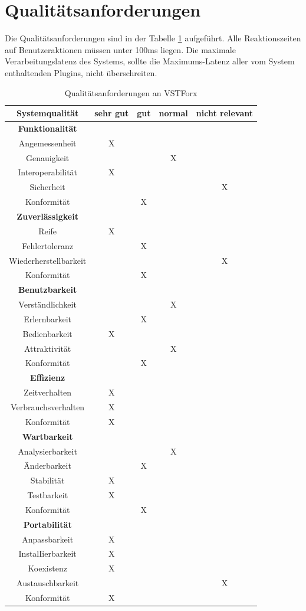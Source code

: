 \section{Qualitätsanforderungen}


\newcommand{\haupt}[1]{\textbf{#1}		&				& 			&			& 	 			    \\}
\newcommand{\noteA}[1]{\hline#1			&		X		& 			&			& 	 			    \\}
\newcommand{\noteB}[1]{\hline#1			&		 		& 	   X		&			& 	 			    \\}
\newcommand{\noteC}[1]{\hline#1			&				& 			&	   X		& 	 			    \\}
\newcommand{\noteD}[1]{\hline#1			&				& 			&			& 	 	X		    \\}
\newcommand{\noteX}[1]{\hline#1			&		-		& 	    -		&	    -     	& 	 	-		    \\}

Die Qualitätsanforderungen sind in der Tabelle \ref{quali} aufgeführt.
 Alle Reaktionszeiten auf Benutzeraktionen müssen unter 100ms liegen. Die maximale Verarbeitungslatenz des Systems, sollte die Maximums-Latenz aller vom System enthaltenden Plugins, nicht überschreiten.

\begin{table}[htdp]
\caption{Qualitätsanforderungen an VSTForx}
\begin{center}
\begin{tabular}{c|c|c|c|c}

Systemqualität				&	sehr gut	& 	gut		&	normal	& 	nicht relevant \\
\hline 
\hline 
\haupt{Funktionalität}	
\noteA{Angemessenheit} 	
\noteC{Genauigkeit}				
\noteA{Interoperabilität}
\noteD{Sicherheit}
\noteB{Konformität}

\hline
\hline 
\haupt{Zuverlässigkeit}
\noteA{Reife}
\noteB{Fehlertoleranz}
\noteD{Wiederherstellbarkeit}
\noteB{Konformität}

\hline 
\hline
\haupt{Benutzbarkeit}
\noteC{Verständlichkeit}
\noteB{Erlernbarkeit}
\noteA{Bedienbarkeit}
\noteC{Attraktivität}
\noteB{Konformität}

\hline 
\hline
\haupt{Effizienz}
\noteA{Zeitverhalten}
\noteA{Verbrauchsverhalten}
\noteA{Konformität}

\hline 
\hline
\haupt{Wartbarkeit}
\noteC{Analysierbarkeit}
\noteB{Änderbarkeit}
\noteA{Stabilität}
\noteA{Testbarkeit}
\noteB{Konformität}

\hline 
\hline
\haupt{Portabilität}
\noteA{Anpassbarkeit}
\noteA{InstalIierbarkeit}
\noteA{Koexistenz}
\noteD{Austauschbarkeit}
\noteA{Konformität}



\end{tabular}
\end{center}
\label{quali}
\end{table}
